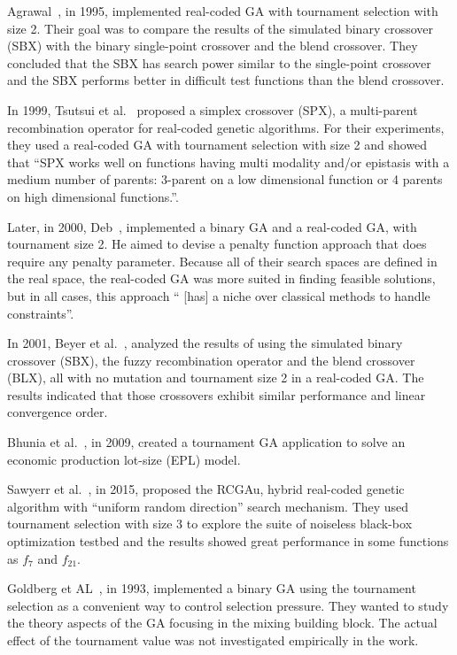 Agrawal~\cite{agrawal1995simulated}, in 1995, implemented real-coded GA with tournament selection with size 2. Their goal was to compare the results of the simulated binary crossover (SBX) with the binary single-point crossover and the blend crossover. They concluded that the SBX has search power similar to the single-point crossover and the SBX performs better in difficult test functions than the blend crossover. 

In 1999, Tsutsui et al.~\cite{tsutsui1999multi} proposed a simplex crossover (SPX), a multi-parent recombination operator for real-coded genetic algorithms. For their experiments, they used a real-coded GA with tournament selection with size 2 and showed that ``SPX works well on functions having multi modality and/or epistasis with a medium number of parents: 3-parent on a low dimensional function or 4 parents on high dimensional functions.''. 

Later, in 2000, Deb~\cite{deb2000efficient}, implemented a binary GA and a real-coded GA, with tournament size 2. He aimed to devise a penalty function approach that does require any penalty parameter. Because all of their search spaces are defined in the real space, the real-coded GA was more suited in finding feasible solutions, but in all cases, this approach `` [has] a niche over classical methods to handle constraints''.


In 2001, Beyer et al.~\cite{beyer2001self}, analyzed the results of using the simulated binary crossover (SBX), the fuzzy recombination operator and the blend crossover (BLX), all with no mutation and tournament size 2 in a real-coded GA. The results indicated that those crossovers exhibit similar performance and linear convergence order.


Bhunia et al.~\cite{bhunia2009application}, in 2009, created a tournament GA application to solve an economic production lot-size (EPL) model. 

Sawyerr et al.~\cite{sawyerr2015benchmarking}, in 2015, proposed the RCGAu, hybrid real-coded genetic algorithm with ``uniform random direction'' search mechanism. They used tournament selection with size 3 to explore the suite of noiseless black-box optimization testbed and the results showed great performance in some functions as $f_7$ and $f_{21}$.

Goldberg et AL~\cite{goldberg1993toward}, in 1993, implemented a binary GA using the tournament selection as a convenient way to control selection pressure. They wanted to study the theory aspects of the GA focusing in the mixing building block. The actual effect of the tournament value was not investigated empirically in the work.

